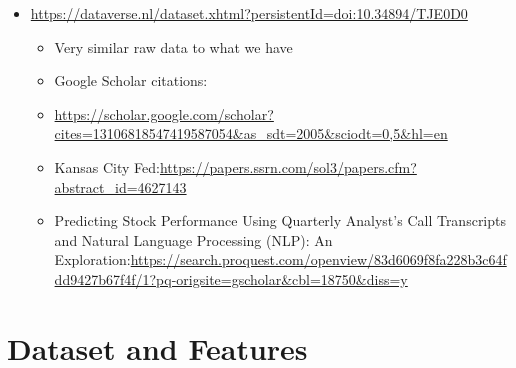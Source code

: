 \documentclass{article}
\providecommand{\tightlist}{%
  \setlength{\itemsep}{0pt}\setlength{\parskip}{0pt}}
\newif\ifshowInstructions
\newcommand{\instructions}[1]{%
    \ifshowInstructions%
        \textcolor{violet}{#1}%
    \fi%
}
\begin{document}
\begin{itemize}
\tightlist
\item
  \url{https://dataverse.nl/dataset.xhtml?persistentId=doi:10.34894/TJE0D0}

  \begin{itemize}
  \tightlist
  \item
    Very similar raw data to what we have
  \item
    Google Scholar citations:
  \item
    \url{https://scholar.google.com/scholar?cites=13106818547419587054&as_sdt=2005&sciodt=0,5&hl=en}
  \item
    Kansas City
    Fed:\url{https://papers.ssrn.com/sol3/papers.cfm?abstract_id=4627143}
  \item
    Predicting Stock Performance Using Quarterly Analyst's Call
    Transcripts and Natural Language Processing (NLP): An
    Exploration:\url{https://search.proquest.com/openview/83d6069f8fa228b3c64fdd9427b67f4f/1?pq-origsite=gscholar&cbl=18750&diss=y}
  \end{itemize}
\end{itemize}


\section{Dataset and Features}
\instructions{%
Describe your dataset: how many training/validation/test examples do you have? Is there any preprocessing you did? What about normalization or data augmentation? What is the resolution of your images? How is your time-series data discretized? Include a citation on where you obtained your dataset from. Depending on available space, show some examples from your dataset. You should also talk about the features you used. If you extracted features using Fourier transforms, word2vec, histogram of oriented gradients (HOG), PCA, ICA, etc. make sure to talk about it. Try to include examples of your data in the report (e.g. include an image, show a waveform, etc.).
}
\end{document}
